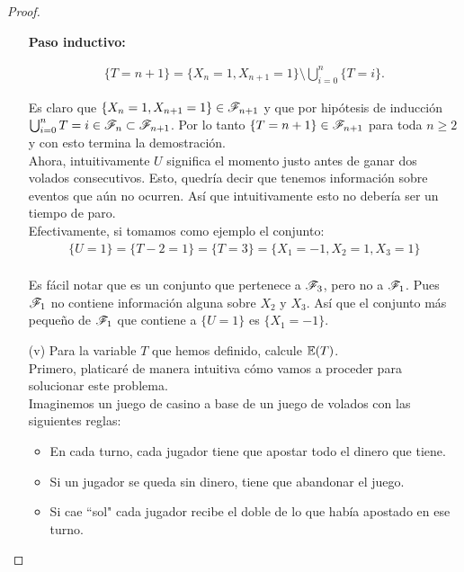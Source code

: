 \begin{proof}
\begin{enumerate}
			\textbf{Paso inductivo:}
				
				\begin{align}
					\{T = n + 1 \} = \{ X_n = 1, X_{n+1} = 1\} \setminus \bigcup_{i=0}^{n} \{T = i\}.
				\end{align}				
			
				Es claro que $\{ X_n = 1, X_{n+1} = 1\} \in \mathscr{F}_{n + 1}$ y que por hipótesis de inducción
				$\bigcup_{i=0}^{n} {T = i} \in \mathscr{F}_n \subset \mathscr{F}_{n + 1}$. Por lo tanto
				$\{T = n + 1 \} \in \mathscr{F}_{n+1}$ para toda $n \geq 2$ y con esto termina la demostración.\\
				
			Ahora, intuitivamente $U$ significa el momento justo antes de ganar dos volados consecutivos.
			Esto, quedría decir que tenemos información sobre eventos que aún no ocurren. Así que intuitivamente
			esto no debería ser un tiempo de paro.\\
			
			Efectivamente, si tomamos como ejemplo el conjunto: 
				\begin{align}
					\{ U = 1 \} = \{ T - 2 = 1\} = \{ T = 3\} = \{X_1 = -1, X_2 = 1, X_3 = 1\}
				\end{align}		\\
					
			Es fácil notar que es un conjunto que pertenece a $\mathscr{F}_3$, pero no a $\mathscr{F}_1$. Pues $\mathscr{F}_1$
			no contiene información alguna sobre $X_2$ y $X_3$. Así que el conjunto más pequeño de $\mathscr{F}_1$ 
			que contiene a $\{ U = 1 \}$ es $\{ X_1 = -1 \}$.\\
			
		\item[(v)] 
		Para la variable $T$ que hemos definido, calcule $\mathbb{E}\! \left( T \right)$.\\
		
		   	Primero, platicaré de manera intuitiva cómo vamos a proceder para solucionar este problema.\\
		
		   	Imaginemos un juego de casino a base de un juego de volados con las siguientes reglas:\\
		   	\begin{itemize}
		   			\item En cada turno, cada jugador tiene que apostar todo el dinero que tiene.
		   			\item Si un jugador se queda sin dinero, tiene que abandonar el juego.
		   			\item Si cae ``sol" cada jugador recibe el doble de lo que había apostado en ese turno.  
		   	\end{itemize}
		   

\end{enumerate}
\end{proof}
